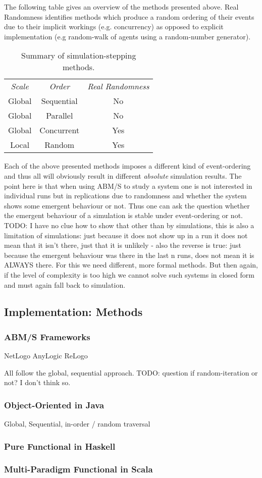 \bigskip 

The following table gives an overview of the methods presented above. Real Randomness identifies methods which produce a random ordering of their events due to their implicit workings (e.g.  concurrency) as opposed to explicit implementation (e.g random-walk of agents using a random-number generator).

\begin{table}[H]
	\center
	\begin{tabular}{ c | c | c  }
		\textit{Scale} & \textit{Order} & \textit{Real Randomness} \\
		\hhline{=|=|=}
	    Global & Sequential & No \\ 
	    \hline
	    Global & Parallel & No \\ 
	    \hline
	    Global & Concurrent & Yes \\ 
	    \hline
	    Local & Random & Yes \\ 
	\end{tabular}
	\caption{Summary of simulation-stepping methods.}
\end{table}

Each of the above presented methods imposes a different kind of event-ordering and thus all will obviously result in different \textit{absolute} simulation results. The point here is that when using ABM/S to study a system one is not interested in individual runs but in replications due to randomness and whether the system shows some emergent behaviour or not. Thus one can ask the question whether the emergent behaviour of a simulation is stable under event-ordering or not. TODO: I have no clue how to show that other than by simulations, this is also a limitation of simulations: just because it does not show up in a run it does not mean that it isn't there, just that it is unlikely - also the reverse is true: just because the emergent behaviour was there in the last n runs, does not mean it is ALWAYS there. For this we need different, more formal methods. But then again, if the level of complexity is too high we cannot solve such systems in closed form and must again fall back to simulation.


\subsection{Implementation: Methods}

\subsubsection{ABM/S Frameworks}
NetLogo
AnyLogic
ReLogo

All follow the global, sequential approach. TODO: question if random-iteration or not? I don't think so.

\subsubsection{Object-Oriented in Java}
Global, Sequential, in-order / random traversal

\subsubsection{Pure Functional in Haskell}


\subsubsection{Multi-Paradigm Functional in Scala}
